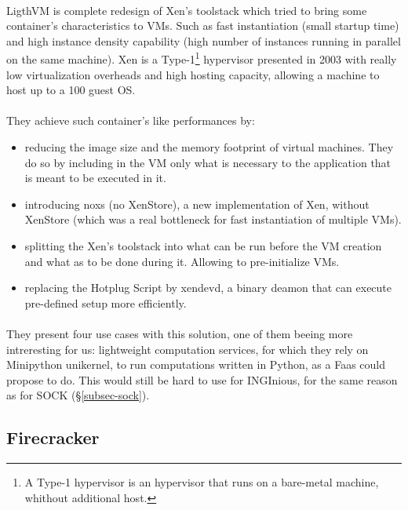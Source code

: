 \paragraph{}LigthVM is complete redesign of Xen's toolstack which tried to bring some container's characteristics to VMs.  Such as fast instantiation (small startup time) and high instance density capability (high number of instances running in parallel on the same machine).\cite{manco2017my}  Xen is a Type-1\footnote{A Type-1 hypervisor is an hypervisor that runs on a bare-metal machine, whithout additional host.} hypervisor presented in 2003 with really low virtualization overheads and high hosting capacity, allowing a machine to host up to a 100 guest OS.\cite{barham2003xen}  
\paragraph{}They achieve such container's like performances by:
\begin{itemize}
\renewcommand\labelitemi{--}
  \item reducing the image size and the memory footprint of virtual machines.  They do so by including in the VM only what is necessary to the application that is meant to be executed in it.
  \item introducing noxs (no XenStore), a new implementation of Xen, without XenStore (which was a real bottleneck for fast instantiation of multiple VMs).
  \item splitting the Xen's toolstack into what can be run before the VM creation and what as to be done during it.  Allowing to pre-initialize VMs.
  \item replacing the Hotplug Script by xendevd, a binary deamon that can execute pre-defined setup more efficiently.
\end{itemize}

\paragraph{}They present four use cases with this solution, one of them beeing more intreresting for us: lightweight computation services, for which they rely on Minipython unikernel, to run computations written in Python, as a Faas could propose to do.  This would still be hard to use for INGInious, for the same reason as for SOCK (§\ref{subsec-sock}).

\subsection{Firecracker} 
